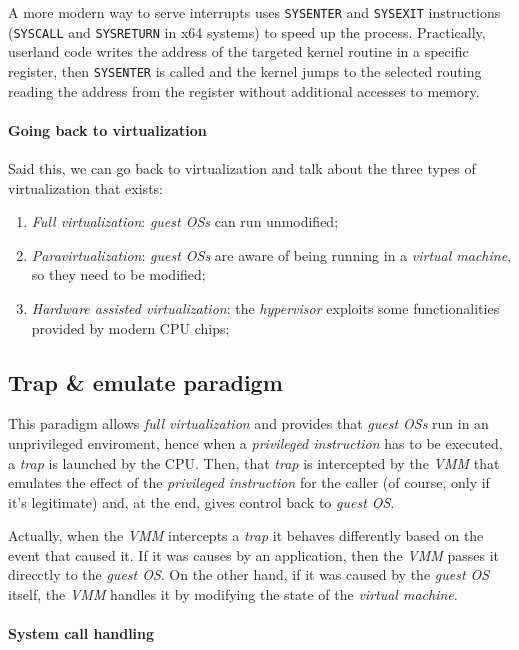 A more modern way to serve interrupts uses \texttt{SYSENTER} and
\texttt{SYSEXIT} instructions (\texttt{SYSCALL} and \texttt{SYSRETURN} in
x64 systems) to speed up the process. Practically, userland code writes the
address of the targeted kernel routine in a specific register, then
\texttt{SYSENTER} is called and the kernel jumps to the selected routing
reading the address from the register without additional accesses to memory.

\paragraph{Going back to virtualization}
Said this, we can go back to virtualization and talk about the three types
of virtualization that exists:
\begin{enumerate}
    \item\emph{Full virtualization}: \emph{guest OSs} can run unmodified;
    \item\emph{Paravirtualization}: \emph{guest OSs} are aware of being running
    in a \emph{virtual machine}, so they need to be modified;
    \item\emph{Hardware assisted virtualization}: the \emph{hypervisor} exploits
    some functionalities provided by modern CPU chips;
\end{enumerate}

\subsection{Trap \& emulate paradigm}
This paradigm allows \emph{full virtualization} and provides that \emph{guest
OSs} run in an unprivileged enviroment, hence when a \emph{privileged
instruction} has to be executed, a \emph{trap} is launched by the CPU. Then,
that \emph{trap} is intercepted by the \emph{VMM} that emulates the effect of
the \emph{privileged instruction} for the caller (of course, only if it's
legitimate) and, at the end, gives control back to \emph{guest OS}.

Actually, when the \emph{VMM} intercepts a \emph{trap} it behaves differently
based on the event that caused it. If it was causes by an application, then the
\emph{VMM} passes it direcctly to the \emph{guest OS}. On the other hand, if it
was caused by the \emph{guest OS} itself, the \emph{VMM} handles it by
modifying the state of the \emph{virtual machine}.

\paragraph{System call handling}
\mbox{}

